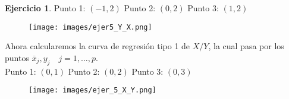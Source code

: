\documentclass[a4paper, 12pt]{article}
\theoremstyle{definition}
\newtheorem{ej}{Ejercicio}
\begin{document}
\begin{ej}
Punto 1: \((-1, 2)\) \hspace{1cm} Punto 2: \((0, 2)\) \hspace{1cm} Punto 3: \((1, 2)\)

\newpage

\begin{figure}[!h]
	\centering
	\texttt{[image: images/ejer5\_Y\_X.png]}
\end{figure}

\par 

Ahora calcularemos la curva de regresión tipo 1 de \(X/Y\), la cual pasa por los puntos \(\overline{x}_j, y_j \quad j = 1, \dotsc, p\). \\

Punto 1: \((0, 1)\) \hspace{1cm} Punto 2: \((0, 2)\) \hspace{1cm} Punto 3: \((0, 3)\)

\begin{figure}[!h]
	\centering
	\texttt{[image: images/ejer\_5\_X\_Y.png]}
\end{figure}

\end{ej}
\end{document}
